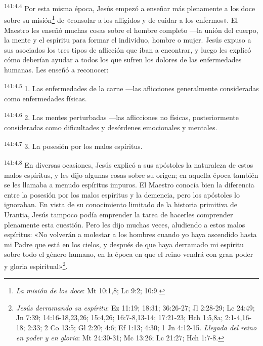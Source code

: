 \par 
\textsuperscript{141:4.4} Por esta misma época, Jesús empezó a enseñar más plenamente a los doce sobre su misión\footnote{\textit{La misión de los doce}: Mt 10:1,8; Lc 9:2; 10:9.} de «consolar a los afligidos y de cuidar a los enfermos». El Maestro les enseñó muchas cosas sobre el hombre completo ---la unión del cuerpo, la mente y el espíritu para formar el individuo, hombre o mujer. Jesús expuso a sus asociados los tres tipos de aflicción que iban a encontrar, y luego les explicó cómo deberían ayudar a todos los que sufren los dolores de las enfermedades humanas. Les enseñó a reconocer:

\par 
\textsuperscript{141:4.5} 1. Las enfermedades de la carne ---las aflicciones generalmente consideradas como enfermedades físicas.

\par 
\textsuperscript{141:4.6} 2. Las mentes perturbadas ---las aflicciones no físicas, posteriormente consideradas como dificultades y desórdenes emocionales y mentales.

\par 
\textsuperscript{141:4.7} 3. La posesión por los malos espíritus.

\par 
\textsuperscript{141:4.8} En diversas ocasiones, Jesús explicó a sus apóstoles la naturaleza de estos malos espíritus, y les dijo algunas cosas sobre su origen; en aquella época también se les llamaba a menudo espíritus impuros. El Maestro conocía bien la diferencia entre la posesión por los malos espíritus y la demencia, pero los apóstoles lo ignoraban. En vista de su conocimiento limitado de la historia primitiva de Urantia, Jesús tampoco podía emprender la tarea de hacerles comprender plenamente esta cuestión. Pero les dijo muchas veces, aludiendo a estos malos espíritus: «No volverán a molestar a los hombres cuando yo haya ascendido hasta mi Padre que está en los cielos, y después de que haya derramado mi espíritu sobre todo el género humano, en la época en que el reino vendrá con gran poder y gloria espiritual»\footnote{\textit{Jesús derramando su espíritu}: Ez 11:19; 18:31; 36:26-27; Jl 2:28-29; Lc 24:49; Jn 7:39; 14:16-18,23,26; 15:4,26; 16:7-8,13-14; 17:21-23; Hch 1:5,8a; 2:1-4,16-18; 2:33; 2 Co 13:5; Gl 2:20; 4:6; Ef 1:13; 4:30; 1 Jn 4:12-15. \textit{Llegada del reino en poder y en gloria}: Mt 24:30-31; Mc 13:26; Lc 21:27; Hch 1:7-8.}.

